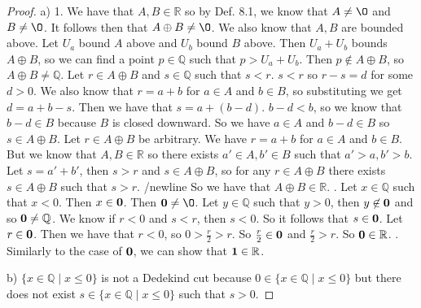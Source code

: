\documentclass[12pt]{article}
\newcommand{\bbQ}{\mathbb{Q}}
\newcommand{\bbR}{\mathbb{R}}
\renewcommand{\emptyset}{\O}
\renewcommand{\_}[1]{\underline{ #1 }}
\theoremstyle{definition}
\numberwithin{equation}{subsection}
\begin{document}
\begin{proof}
a) 1. We have that $A,B \in \bbR$ so by Def. 8.1, we know that $A \not = \emptyset$ and $B \not = \emptyset$. It follows then that $A \oplus B \not = \emptyset$. We also know that $A,B$ are bounded above. Let $U_a$ bound $A$ above and $U_b$ bound $B$ above. Then $U_a + U_b$ bounds $A \oplus B$, so we can find a point $p \in \bbQ$ such that $p > U_a + U_b$. Then $p \not \in A \oplus B$, so $A \oplus B \not = \bbQ$. \newline
Let $r \in A \oplus B$ and $s \in \bbQ$ such that $s < r$. $s < r$ so $r - s = d$ for some $d > 0$. We also know that $r = a + b$ for $a \in A$ and $b \in B$, so substituting we get $d = a + b - s$. Then we have that $s = a + (b - d)$. $b - d < b$, so we know that $b - d \in B$ because $B$ is closed downward. So we have $a \in A$ and $b - d \in B$ so $s \in A \oplus B$. \newline
Let $r \in A \oplus B$ be arbitrary. We have $r = a + b$ for $a \in A$ and $b \in B$. But we know that $A,B \in \bbR$ so there exists $a' \in A, b' \in B$ such that $a' > a, b' > b$. Let $s = a' + b'$, then $s > r$ and $s \in A \oplus B$, so for any $r \in A \oplus B$ there exists $s \in A \oplus B$ such that $s > r$. /newline
So we have that $A \oplus B \in \bbR$. . Let $x \in \bbQ$ such that $x < 0$. Then $x \in {\bf 0}$. Then ${\bf 0} \not = \emptyset$. Let $y \in \bbQ$ such that $y > 0$, then $y \not \in {\bf 0}$ and so ${\bf 0} \not = \bbQ$. \newline
We know if $r < 0$ and $s < r$, then $s < 0$. So it follows that $s \in {\bf 0}$. \newline
Let $r \in {\bf 0}$. Then we have that $r < 0$, so $0 > \frac{r}{2} > r$. So $\frac{r}{2} \in {\bf 0}$ and $\frac{r}{2} > r$. \newline
So ${\bf 0} \in \bbR$. . Similarly to the case of ${\bf 0}$, we can show that ${\bf 1} \in \bbR$. \newline

b) $\{x\in\bbQ\mid x\leq 0\}$ is not a Dedekind cut because $0 \in \{x\in\bbQ\mid x\leq 0\}$ but there does not exist $s \in \{x\in\bbQ\mid x\leq 0\}$ such that $s > 0$. \newline


\end{proof}
\end{document}
